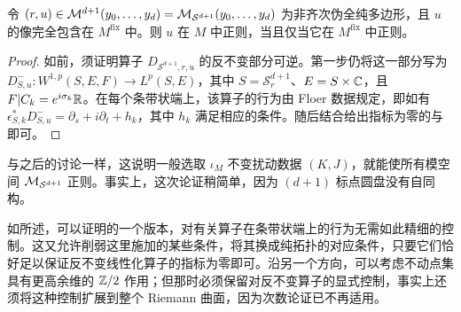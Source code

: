 \begin{lemma}\label{st:14.7}
令 $(r,u)\in\mathcal M^{d+1}(y_0,\ldots,y_d)=\mathcal M_{\mathcal S^{d+1}}(y_0,\ldots,y_d)$ 为非齐次伪全纯多边形，且 $u$ 的像完全包含在 $M^{\mathrm{fix}}$ 中。则 $u$ 在 $M$ 中正则，当且仅当它在 $M^{\mathrm{fix}}$ 中正则。
\end{lemma}
\begin{proof}
如前，须证明算子 $D_{\mathcal S^{d+1},r,u}$ 的反不变部分可逆。第一步仍将这一部分写为 $D^-_{S,u}:W^{1,p}(S,E,F)\to L^p(S,E)$，其中 $S=\mathcal S^{d+1}_r$、$E=S\times\mathbb C$，且 $F|C_k=e^{i\sigma_k}\mathbb R$。在每个条带状端上，该算子的行为由 Floer 数据规定，即如有 $\epsilon_{S,k}^*D^-_{S,u}=\partial_s+i\partial_t+h_k$，其中 $h_k$ 满足相应的条件。随后结合给出指标为零的与即可。
\end{proof}

与之后的讨论一样，这说明一般选取 $\iota_M$ 不变扰动数据 $(K,J)$，就能使所有模空间 $\mathcal M_{\mathcal S^{d+1}}$ 正则。事实上，这次论证稍简单，因为 $(d+1)$ 标点圆盘没有自同构。

\begin{note}\label{st:14.8}
如所述，可以证明的一个版本，对有关算子在条带状端上的行为无需如此精细的控制。这又允许削弱这里施加的某些条件，将其换成纯拓扑的对应条件，只要它们恰好足以保证反不变线性化算子的指标为零即可。沿另一个方向，可以考虑不动点集具有更高余维的 $\mathbb Z/2$ 作用；但那时必须保留对反不变算子的显式控制，事实上还须将这种控制扩展到整个 Riemann 曲面，因为次数论证已不再适用。
\end{note}
